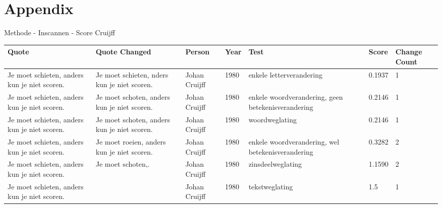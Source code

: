 \documentclass[12pt]{article}
\begin{document}
\pagebreak
\section{Appendix} 

\Large Methode - Inscannen - Score
\noindent\large Cruijff
\small
\begin{longtable}{|p{}|p{}|p{}|p{}|p{}|p{}|p{}|}
\hline
\textbf{Quote} & \textbf{Quote Changed} & \textbf{Person} & \textbf{Year} & \textbf{Test} & \textbf{Score} & \textbf{Change Count} \\
\hline
\endhead
%
\endfoot
%
Je moet schieten, anders kun je niet scoren. & Je moet schieten, nders kun je niet scoren. & Johan Cruijff & 1980 & enkele letterverandering & 0.1937 & 1 \\
\hline
Je moet schieten, anders kun je niet scoren. & Je moet schoten, anders kun je niet scoren. & Johan Cruijff & 1980 & enkele woordverandering, geen betekenisverandering & 0.2146 & 1 \\
\hline
Je moet schieten, anders kun je niet scoren. & Je moet schoten, anders kun je niet scoren. & Johan Cruijff & 1980 & woordweglating & 0.2146 & 1 \\
\hline
Je moet schieten, anders kun je niet scoren. & Je moet roeien, anders kun je niet scoren. & Johan Cruijff & 1980 & enkele woordverandering, wel betekenisverandering & 0.3282 & 2 \\
\hline
Je moet schieten, anders kun je niet scoren. & Je moet schoten,. & Johan Cruijff & 1980 & zinsdeelweglating & 1.1590 & 2 \\
\hline
Je moet schieten, anders kun je niet scoren. &  & Johan Cruijff & 1980 & tekstweglating & 1.5 & 1 \\
\hline
\end{longtable}
\end{document}
